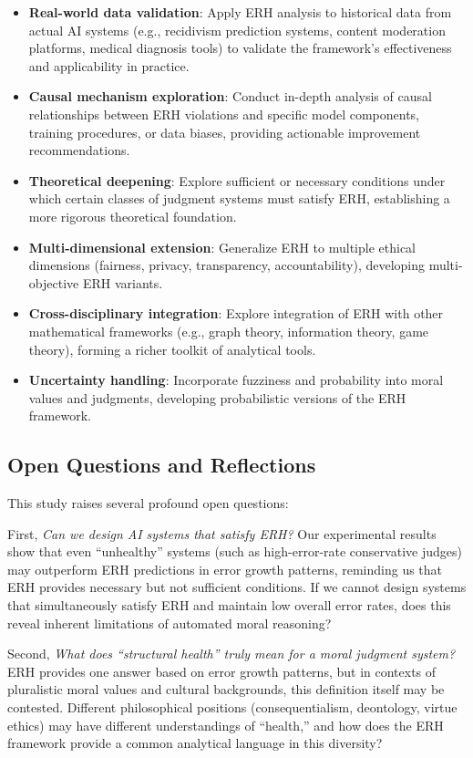 \documentclass[12pt,a4paper]{article}
\theoremstyle{definition}
\theoremstyle{remark}
\begin{document}
\begin{itemize}
    \item \textbf{Real-world data validation}: Apply ERH analysis to historical data from actual AI systems (e.g., recidivism prediction systems, content moderation platforms, medical diagnosis tools) to validate the framework's effectiveness and applicability in practice.
    \item \textbf{Causal mechanism exploration}: Conduct in-depth analysis of causal relationships between ERH violations and specific model components, training procedures, or data biases, providing actionable improvement recommendations.
    \item \textbf{Theoretical deepening}: Explore sufficient or necessary conditions under which certain classes of judgment systems must satisfy ERH, establishing a more rigorous theoretical foundation.
    \item \textbf{Multi-dimensional extension}: Generalize ERH to multiple ethical dimensions (fairness, privacy, transparency, accountability), developing multi-objective ERH variants.
    \item \textbf{Cross-disciplinary integration}: Explore integration of ERH with other mathematical frameworks (e.g., graph theory, information theory, game theory), forming a richer toolkit of analytical tools.
    \item \textbf{Uncertainty handling}: Incorporate fuzziness and probability into moral values and judgments, developing probabilistic versions of the ERH framework.
\end{itemize}

\subsection{Open Questions and Reflections}

This study raises several profound open questions:

First, \emph{Can we design AI systems that satisfy ERH?} Our experimental results show that even ``unhealthy'' systems (such as high-error-rate conservative judges) may outperform ERH predictions in error growth patterns, reminding us that ERH provides necessary but not sufficient conditions. If we cannot design systems that simultaneously satisfy ERH and maintain low overall error rates, does this reveal inherent limitations of automated moral reasoning?

Second, \emph{What does ``structural health'' truly mean for a moral judgment system?} ERH provides one answer based on error growth patterns, but in contexts of pluralistic moral values and cultural backgrounds, this definition itself may be contested. Different philosophical positions (consequentialism, deontology, virtue ethics) may have different understandings of ``health,'' and how does the ERH framework provide a common analytical language in this diversity?
\end{document}
